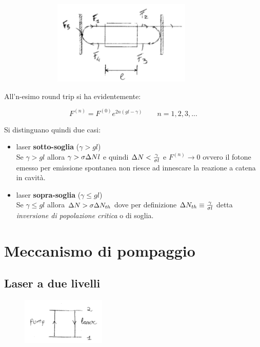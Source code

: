 \begin{figure}[H]
    \centering
    \includegraphics[width=10cm, height=4cm]{flux_schema_laser}
\end{figure}

All'n-esimo round trip si ha evidentemente:

\begin{equation*}
    F^{(n)} = F^{(0)} e^{2n(gl - \gamma)} \qquad n = 1, 2, 3, ...
\end{equation*}

Si distinguano quindi due casi:
\begin{itemize}
    \item laser \textbf{sotto-soglia} ($\gamma > gl$)\\
    Se $\gamma > gl$ allora $\gamma > \sigma \Delta N l$ e quindi $\Delta N < \frac{\gamma}{\sigma l}$ e $F^{(n)} \rightarrow 0$ ovvero il fotone emesso per emissione spontanea non riesce ad innescare la reazione a catena in cavità.
    \item laser \textbf{sopra-soglia} ($\gamma \leq gl$)\\
    Se $\gamma \leq gl$ allora $\Delta N > \sigma \Delta N_{th}$ dove per definizione $\Delta N_{th} \equiv \frac{\gamma}{\sigma l}$ detta \textit{inversione di popolazione critica} o di soglia.
\end{itemize}

\section{Meccanismo di pompaggio}

\subsection{Laser a due livelli}

\begin{figure}[H]
    \centering
    \includegraphics[width=4cm]{due_livelli}
\end{figure}

